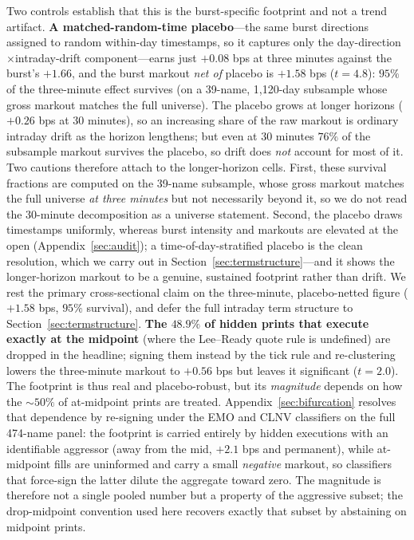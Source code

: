 \documentclass[11pt]{article}
\begin{document}
Two controls establish that this is the burst-specific footprint and not a trend artifact. \textbf{A matched-random-time placebo}---the same burst directions assigned to random within-day timestamps, so it captures only the day-direction$\times$intraday-drift component---earns just $+0.08$ bps at three minutes against the burst's $+1.66$, and the burst markout \emph{net of} placebo is $+1.58$ bps ($t=4.8$): $95\%$ of the three-minute effect survives (on a 39-name, 1{,}120-day subsample whose gross markout matches the full universe). The placebo grows at longer horizons ($+0.26$ bps at 30 minutes), so an increasing share of the raw markout is ordinary intraday drift as the horizon lengthens; but even at 30 minutes $76\%$ of the subsample markout survives the placebo, so drift does \emph{not} account for most of it. Two cautions therefore attach to the longer-horizon cells. First, these survival fractions are computed on the 39-name subsample, whose gross markout matches the full universe \emph{at three minutes} but not necessarily beyond it, so we do not read the 30-minute decomposition as a universe statement. Second, the placebo draws timestamps uniformly, whereas burst intensity and markouts are elevated at the open (Appendix~\ref{sec:audit}); a time-of-day-stratified placebo is the clean resolution, which we carry out in Section~\ref{sec:termstructure}---and it shows the longer-horizon markout to be a genuine, sustained footprint rather than drift. We rest the primary cross-sectional claim on the three-minute, placebo-netted figure ($+1.58$ bps, $95\%$ survival), and defer the full intraday term structure to Section~\ref{sec:termstructure}. \textbf{The $48.9\%$ of hidden prints that execute exactly at the midpoint} (where the Lee--Ready quote rule is undefined) are dropped in the headline; signing them instead by the tick rule and re-clustering lowers the three-minute markout to $+0.56$ bps but leaves it significant ($t=2.0$). The footprint is thus real and placebo-robust, but its \emph{magnitude} depends on how the $\sim\!50\%$ of at-midpoint prints are treated. Appendix~\ref{sec:bifurcation} resolves that dependence by re-signing under the EMO and CLNV classifiers on the full 474-name panel: the footprint is carried entirely by hidden executions with an identifiable aggressor (away from the mid, $+2.1$ bps and permanent), while at-midpoint fills are uninformed and carry a small \emph{negative} markout, so classifiers that force-sign the latter dilute the aggregate toward zero. The magnitude is therefore not a single pooled number but a property of the aggressive subset; the drop-midpoint convention used here recovers exactly that subset by abstaining on midpoint prints.
\end{document}
